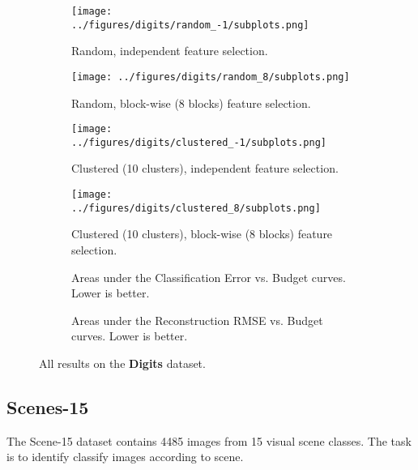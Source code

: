 \begin{figure}[ht!]
    \centering
    \begin{subfigure}[b]{\textwidth}
        \centering
        \texttt{[image: ../figures/digits/random\_-1/subplots.png]}
        \caption{Random, independent feature selection.\vspace{.2cm}}
    \end{subfigure}
    \begin{subfigure}[b]{\textwidth}
        \centering
        \texttt{[image: ../figures/digits/random\_8/subplots.png]}
        \caption{Random, block-wise (8 blocks) feature selection.\vspace{.2cm}}
    \end{subfigure}
    \begin{subfigure}[b]{\textwidth}
        \centering
        \texttt{[image: ../figures/digits/clustered\_-1/subplots.png]}
        \caption{Clustered (10 clusters), independent feature selection.\vspace{.2cm}}
    \end{subfigure}
    \begin{subfigure}[b]{\textwidth}
        \centering
        \texttt{[image: ../figures/digits/clustered\_8/subplots.png]}
        \caption{Clustered (10 clusters), block-wise (8 blocks) feature selection.\vspace{.2cm}}
    \end{subfigure}

    \small{
    \begin{subfigure}[b]{1\textwidth}
        \centering
        
        \caption{Areas under the Classification Error vs. Budget curves. Lower is better.}
    \end{subfigure}
    \begin{subfigure}[b]{1\textwidth}
        \centering
        
        \caption{Areas under the Reconstruction RMSE vs. Budget curves. Lower is better.}
    \end{subfigure}
    }
    \caption{All results on the \textbf{Digits} dataset.}
    \label{fig:digits}
\end{figure}

\subsection{Scenes-15}
The Scene-15 dataset \cite{Lazebnik-CVPR-2006} contains 4485 images from 15 visual scene classes.
The task is to identify classify images according to scene.

